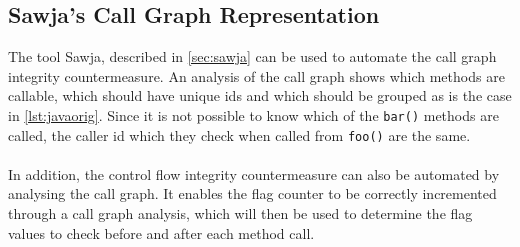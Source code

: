 \subsection{Sawja's Call Graph Representation}
The tool Sawja, described in \cref{sec:sawja} can be used to automate the call graph integrity countermeasure. An analysis of the call graph shows which methods are callable, which should have unique ids and which should be grouped as is the case in \cref{lst:javaorig}. Since it is not possible to know which of the \texttt{bar()} methods are called, the caller id which they check when called from \texttt{foo()} are the same.\\\\ 

In addition, the control flow integrity countermeasure can also be automated by analysing the call graph. It enables the flag counter to be correctly incremented through a call graph analysis, which will then be used to determine the flag values to check before and after each method call.